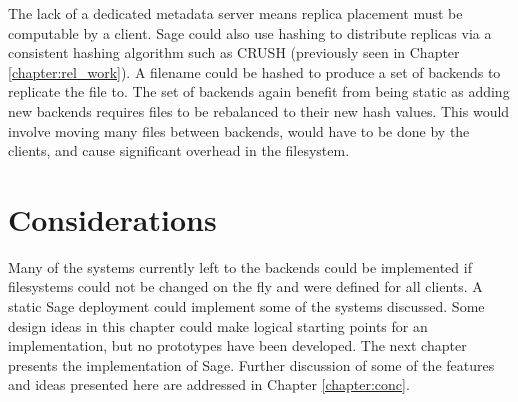 The lack of a dedicated metadata server means replica placement must be computable by a client. Sage could also use hashing to distribute replicas via a consistent hashing algorithm such as CRUSH (previously seen in Chapter \ref{chapter:rel_work}). A filename could be hashed to produce a set of backends to replicate the file to. The set of backends again benefit from being static as adding new backends requires files to be rebalanced to their new hash values. This would involve moving many files between backends, would have to be done by the clients, and cause significant overhead in the filesystem.

\section{Considerations}

Many of the systems currently left to the backends could be implemented if filesystems could not be changed on the fly and were defined for all clients. A static Sage deployment could implement some of the systems discussed. Some design ideas in this chapter could make logical starting points for an implementation, but no prototypes have been developed. The next chapter presents the implementation of Sage. Further discussion of some of the features and ideas presented here are addressed in Chapter \ref{chapter:conc}.